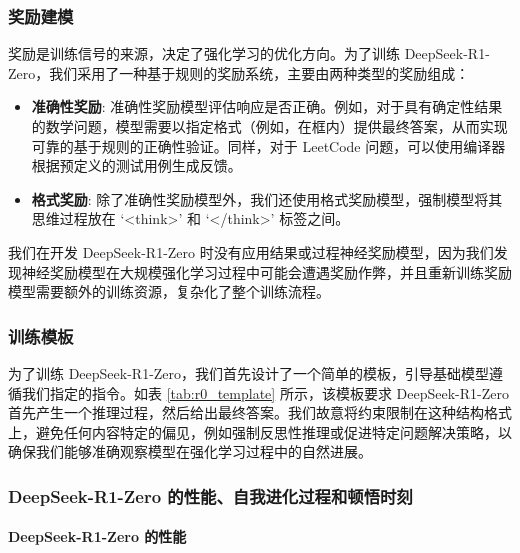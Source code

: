 \documentclass[11pt, a4paper, logo, copyright, nonumbering]{deepseek}
\newcommand{\dsro}{DeepSeek-R1-Zero}
\begin{document}
\subsubsection{奖励建模} 奖励是训练信号的来源，决定了强化学习的优化方向。为了训练 \dsro{}，我们采用了一种基于规则的奖励系统，主要由两种类型的奖励组成：
\begin{itemize}[topsep=0pt]
    \item \textbf{准确性奖励}: 准确性奖励模型评估响应是否正确。例如，对于具有确定性结果的数学问题，模型需要以指定格式（例如，在框内）提供最终答案，从而实现可靠的基于规则的正确性验证。同样，对于 LeetCode 问题，可以使用编译器根据预定义的测试用例生成反馈。
    \item \textbf{格式奖励}: 除了准确性奖励模型外，我们还使用格式奖励模型，强制模型将其思维过程放在 `<think>' 和 `</think>' 标签之间。
\end{itemize}
我们在开发 \dsro{} 时没有应用结果或过程神经奖励模型，因为我们发现神经奖励模型在大规模强化学习过程中可能会遭遇奖励作弊，并且重新训练奖励模型需要额外的训练资源，复杂化了整个训练流程。
\subsubsection{训练模板}

为了训练 \dsro{}，我们首先设计了一个简单的模板，引导基础模型遵循我们指定的指令。如表 \ref{tab:r0_template} 所示，该模板要求 \dsro{} 首先产生一个推理过程，然后给出最终答案。我们故意将约束限制在这种结构格式上，避免任何内容特定的偏见，例如强制反思性推理或促进特定问题解决策略，以确保我们能够准确观察模型在强化学习过程中的自然进展。
\subsubsection{\dsro{} 的性能、自我进化过程和顿悟时刻}

\paragraph{\dsro{} 的性能}
\end{document}
